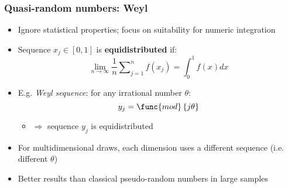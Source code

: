 \documentclass[bigger,handout]{beamer}
\begin{document}
\begin{frame}%

\frametitle{Quasi-random numbers: Weyl}

\begin{itemize}
\item Ignore statistical properties; focus on suitability for numeric
integration

\item Sequence $x_{j}\in \left[ 0,1\right] $ is \textbf{equidistributed} if:%
\begin{equation*}
\lim_{n\rightarrow \infty }\frac{1}{n}\sum\nolimits_{j=1}^{n}f\left(
x_{j}\right) =\int_{0}^{1}f\left( x\right) dx
\end{equation*}

\item E.g. \emph{Weyl sequence}: for any irrational number $\theta $:%
\begin{equation*}
y_{j}=\func{mod}\left\{ j\theta \right\}
\end{equation*}

\begin{itemize}
\item $\Rightarrow $ sequence $y_{j}$ is equidistributed
\end{itemize}

\item For multidimensional draws, each dimension uses \newline
a different sequence (i.e. different $\theta $)

\item Better results than classical pseudo-random numbers in large samples
\end{itemize}


\end{frame}%
\end{document}
